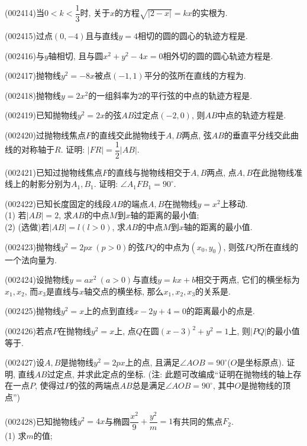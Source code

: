 \item (002414)当$0<k<\dfrac{1}{3}$时, 关于$x$的方程$\sqrt{|2-x|}=kx$的实根为.
\item (002415)过点$(0,-4)$且与直线$y=4$相切的圆的圆心的轨迹方程是.
\item (002416)与$y$轴相切, 且与圆$x^2+y^2-4x=0$相外切的圆的圆心轨迹方程是.
\item (002417)抛物线$y^2=-8x$被点$(-1,1)$平分的弦所在直线的方程为.
\item (002418)抛物线$y=2x^2$的一组斜率为$2$的平行弦的中点的轨迹方程是.
\item (002419)已知抛物线$y^2=2x$的弦$AB$过定点$(-2,0)$, 则$AB$中点的轨迹方程是.
\item (002420)过抛物线焦点$F$的直线交此抛物线于$A,B$两点, 弦$AB$的垂直平分线交此曲线的对称轴于$R$. 证明: $|FR|=\dfrac{1}{2}|AB|$.
\item (002421)已知过抛物线焦点$F$的直线与抛物线相交于$A,B$两点, 点$A,B$在此抛物线准线上的射影分别为$A_1,B_1$. 证明: $\angle A_1FB_1=90^\circ$.
\item (002422)已知长度固定的线段$AB$的端点$A,B$在抛物线$y={{x}^{2}}$上移动.\\ 
(1) 若$|AB|=2$, 求$AB$的中点$M$到$x$轴的距离的最小值;\\ 
(2) (选做)若$|AB|=l(l>0)$, 求$AB$的中点$M$到$x$轴的距离的最小值.
\item (002423)抛物线$y^2=2px \ (p>0)$的弦$PQ$的中点为$(x_0,y_0)$, 则弦$PQ$所在直线的一个法向量为.
\item (002424)设抛物线$y=ax^2 \ (a>0)$与直线$y=kx+b$相交于两点, 它们的横坐标为$x_1,x_2$, 而$x_3$是直线与$x$轴交点的横坐标, 那么$x_1,x_2,x_3$的关系是.
\item (002425)抛物线$y^2=x$上的点到直线$x-2y+4=0$的距离最小的点是.
\item (002426)若点$P$在抛物线$y^2=x$上, 点$Q$在圆$(x-3)^2+y^2=1$上, 则$|PQ|$的最小值等于.
\item (002427)设$A,B$是抛物线$y^2=2px$上的点, 且满足$\angle AOB=90^\circ$($O$是坐标原点). 证明, 直线$AB$过定点, 并求此定点的坐标. (注: 此题可改编成``证明在抛物线的轴上存在一点$P$, 使得过$P$的弦的两端点$AB$总是满足$\angle AOB=90^\circ$, 其中$O$是抛物线的顶点'')
\item (002428)已知抛物线$y^2=4x$与椭圆$\dfrac{x^2}{9}+\dfrac{y^2}{m}=1$有共同的焦点$F_2$.\\ 
(1) 求$m$的值;\\ 
